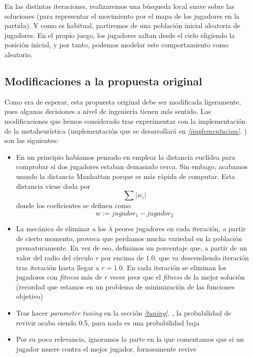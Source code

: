 \documentclass[11pt]{article}
\begin{document}
En las distintas iteraciones, realizaremos una búsqueda local suave sobre las soluciones (para representar el movimiento por el mapa de los jugadores en la partida). Y como es habitual, partiremos de una población inicial aleatoria de jugadores. En el propio juego, los jugadores saltan desde el cielo eligiendo la posición inicial, y por tanto, podemos modelar este comportamiento como aleatorio.

\subsection{Modificaciones a la propuesta original}

Como era de esperar, esta propuesta original debe ser modificada ligeramente, pues algunas decisiones a nivel de ingeniería tienen más sentido. Las modificaciones que hemos considerado tras experimentar con la implementación de la metaheurística (implementación que se desarrollará en \emph{\ref{implementacion}. }) son las siguientes:

\begin{itemize}
    \item En un principio habíamos pensado en emplear la distancia euclídea para comprobar si dos jugadores estaban demasiado cerca. Sin embago, acabamos usando la distancia Manhattan porque es más rápida de computar. Esta distancia viene dada por $$\sum |w_i|$$ donde los coeficientes se definen como $$w := jugador_1 - jugador_2$$
    \item La mecánica de eliminar a los $\lambda$ peores jugadores en cada iteración, a partir de cierto momento, provoca que perdamos mucha variedad en la población prematuramente. En vez de eso, definimos un porcentaje que, a partir de un valor del radio del círculo $r$ por encima de $1.0$, que va descendiendo iteración tras iteración hasta llegar a $r = 1.0$. En cada iteración se eliminan los jugadores con \emph{fitness} más de $r$ veces peor que el \emph{fitness} de la mejor solución (recordad que estamos en un problema de minimización de las funciones objetivo)
    \item Tras hacer \emph{parameter tuning} en la sección \emph{\ref{tuning}. }, la probabilidad de revivir acaba siendo 0.5, para nada es una probabilidad baja
    \item Por su poca relevancia, ignoramos la parte en la que comentamos que si un jugador muere contra el mejor jugador, forzosamente revive
\end{itemize}
\end{document}
